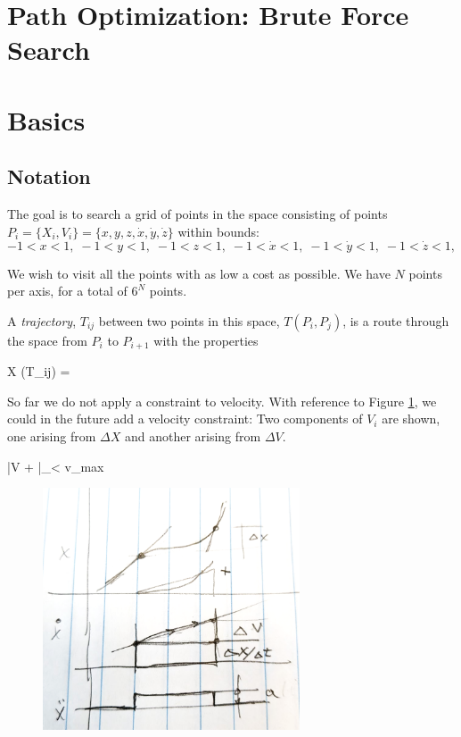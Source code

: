 \documentclass[letterpaper]{article}
\begin{document}
\section*{Path Optimization: Brute Force Search}

\section{Basics}

\subsection{Notation}
The goal is to search a grid of points in the  space consisting of points  $P_i = \{X_i, V_i\} = \{x,y,z,\dot{x},\dot{y},\dot{z}\}$ within bounds:
\[
-1 < x < 1, \;
-1 < y < 1, \;
-1 < z < 1, \;
-1 < \dot{x} < 1, \;
-1 < \dot{y} < 1, \;
-1 < \dot{z} < 1, \;
\]

We wish to visit all the points with as low a cost as possible.
We have $N$ points per axis, for a total of $6^N$ points.

A {\it trajectory}, $T_{ij}$ between two points in this space, $T(P_i,P_j)$, is a route through
the space from $P_i$ to $P_{i+1}$ with the properties

\beq \label{firstconstraint}
\Delta X (T_{ij}) = 
\eeq

So far we do not apply a constraint to velocity.
With reference to Figure \ref{basicTraj}, we could in the future add a
velocity constraint:
Two components of ${V}_i$
are shown, one arising from $\Delta X$ and another arising from $\Delta V$.

\beq \label{complexconstraint}\label{lastconstraint}
|\Delta V +   |_\infty < v_{max}
\eeq

\begin{figure}\centering
  \includegraphics[width=3.0in]{basicTraj.png}
  \caption{}\label{basicTraj}
\end{figure}
\end{document}
